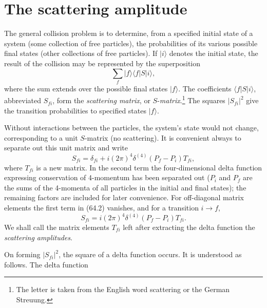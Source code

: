 \section{The scattering amplitude}

The general collision problem is to determine, from a specified initial state of a system (some collection of free particles), the probabilities of its various possible final states (other collections of free particles). If $|i\rangle$ denotes the initial state, the result of the collision may be represented by the superposition
\begin{equation}
\sum_f|f\rangle\langle f|S|i\rangle,
\tag{64.1}
\end{equation}
where the sum extends over the possible final states $|f\rangle$. The coefficients $\langle f|S|i\rangle$, abbreviated $S_{fi}$, form the \emph{scattering matrix}, or $S$-\emph{matrix}.\footnote{The letter is taken from the English word scattering or the German Streuung.} The squares $|S_{fi}|^2$ give the transition probabilities to specified states $|f\rangle$.

Without interactions between the particles, the system's state would not change, corresponding to a unit $S$-matrix (no scattering). It is convenient always to separate out this unit matrix and write
\begin{equation}
S_{fi}=\delta_{fi}+i(2\pi)^4\delta^{(4)}(P_f-P_i)T_{fi},
\tag{64.2}
\end{equation}
where $T_{fi}$ is a new matrix. In the second term the four-dimensional delta function expressing conservation of 4-momentum has been separated out ($P_i$ and $P_f$ are the sums of the 4-momenta of all particles in the initial and final states); the remaining factors are included for later convenience. For off-diagonal matrix elements the first term in (64.2) vanishes, and for a transition $i\to f$,
\begin{equation}
S_{fi}=i(2\pi)^4\delta^{(4)}(P_f-P_i)T_{fi}.
\tag{64.3}
\end{equation}
We shall call the matrix elements $T_{fi}$ left after extracting the delta function the \emph{scattering amplitudes}.

On forming $|S_{fi}|^2$, the square of a delta function occurs. It is understood as follows. The delta function

